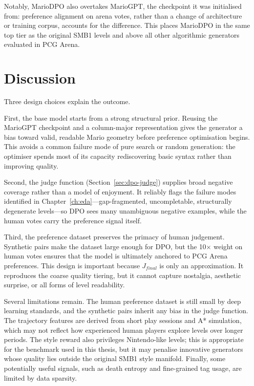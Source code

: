 \documentclass[shortabstract, mgr, english]{iithesis}
\begin{document}
Notably, MarioDPO also overtakes MarioGPT, the checkpoint it was
initialised from: preference alignment on arena votes, rather than a change of
architecture or training corpus, accounts for the difference. This places
MarioDPO in the same top tier as the original SMB1 levels and above all other
algorithmic generators evaluated in PCG Arena.

\section{Discussion}
\label{sec:dpo-discussion}

Three design choices explain the outcome.

First, the base model starts from a strong structural prior. Reusing the
MarioGPT checkpoint and a column-major representation gives the generator a bias
toward valid, readable Mario geometry before preference optimisation begins. This avoids
a common failure mode of pure search or random generation: the optimiser spends
most of its capacity rediscovering basic syntax rather than improving quality.

Second, the judge function (Section~\ref{sec:dpo-judge}) supplies
broad negative coverage rather than a model of enjoyment. It reliably flags
the failure modes identified in Chapter~\ref{ch:eda}---gap-fragmented,
uncompletable, structurally degenerate levels---so DPO sees many unambiguous
negative examples, while the human votes carry the preference signal itself.

Third, the preference dataset preserves the primacy of human judgement. Synthetic
pairs make the dataset large enough for DPO, but the 10$\times$ weight on human
votes ensures that the model is ultimately anchored to PCG Arena preferences.
This design is important because $J_{final}$ is only an approximation. It
reproduces the coarse quality tiering, but it cannot capture nostalgia,
aesthetic surprise, or all forms of level readability.

Several limitations remain. The human preference dataset is still small by deep
learning standards, and the synthetic pairs inherit any bias in the judge
function. The trajectory features are derived from short play sessions and A*
simulation, which may not reflect how experienced human players explore levels
over longer periods. The style reward also privileges Nintendo-like levels; this
is appropriate for the benchmark used in this thesis, but it may penalise
innovative generators whose quality lies outside the original SMB1 style
manifold. Finally, some potentially useful signals, such as death entropy and
fine-grained tag usage, are limited by data sparsity.
\end{document}
